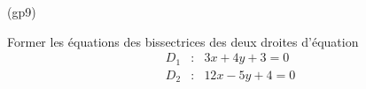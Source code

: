 \begin{tiny}(gp9)\end{tiny}
Former les {\'e}quations des bissectrices des deux droites
d'{\'e}quation
\begin{eqnarray*}
D_{1} &:&3x+4y+3=0 \\
D_{2} &:&12x-5y+4=0
\end{eqnarray*}